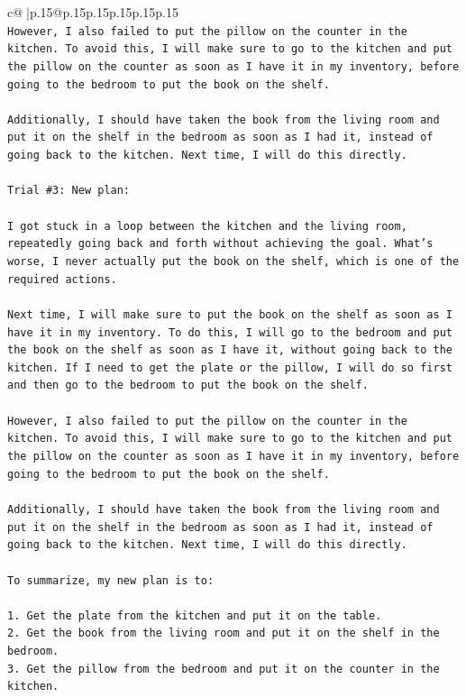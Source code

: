 \documentclass{article}
\begin{document}
{\begin{supertabular}{c@{$\;$}|p{.15\linewidth}@{}p{.15\linewidth}p{.15\linewidth}p{.15\linewidth}p{.15\linewidth}p{.15\linewidth}}
{{{\\ 
\texttt{However, I also failed to put the pillow on the counter in the kitchen. To avoid this, I will make sure to go to the kitchen and put the pillow on the counter as soon as I have it in my inventory, before going to the bedroom to put the book on the shelf. } \\
\\ 
\texttt{Additionally, I should have taken the book from the living room and put it on the shelf in the bedroom as soon as I had it, instead of going back to the kitchen. Next time, I will do this directly.} \\
\\ 
\texttt{Trial \#3: New plan: } \\
\\ 
\texttt{I got stuck in a loop between the kitchen and the living room, repeatedly going back and forth without achieving the goal. What's worse, I never actually put the book on the shelf, which is one of the required actions. } \\
\\ 
\texttt{Next time, I will make sure to put the book on the shelf as soon as I have it in my inventory. To do this, I will go to the bedroom and put the book on the shelf as soon as I have it, without going back to the kitchen. If I need to get the plate or the pillow, I will do so first and then go to the bedroom to put the book on the shelf. } \\
\\ 
\texttt{However, I also failed to put the pillow on the counter in the kitchen. To avoid this, I will make sure to go to the kitchen and put the pillow on the counter as soon as I have it in my inventory, before going to the bedroom to put the book on the shelf. } \\
\\ 
\texttt{Additionally, I should have taken the book from the living room and put it on the shelf in the bedroom as soon as I had it, instead of going back to the kitchen. Next time, I will do this directly.} \\
\\ 
\texttt{To summarize, my new plan is to:} \\
\\ 
\texttt{1. Get the plate from the kitchen and put it on the table.} \\
\texttt{2. Get the book from the living room and put it on the shelf in the bedroom.} \\
\texttt{3. Get the pillow from the bedroom and put it on the counter in the kitchen.} \\
}}}
\end{supertabular}}
\end{document}
